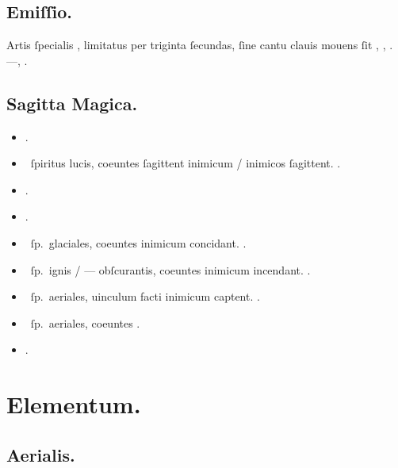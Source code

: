 \documentclass[12pt]{book}
\begin{document}
\subsection{Emiſſio.}\label{emissio}

Artis ſpecialis , limitatus per triginta ſecundas,
ſine cantu clauis mouens ſit , ,
.
---, .

\subsection{Sagitta Magica.}\label{sagitta-magica}

\begin{itemize}
  \item {}.
  \item {}~ſpiritus lucis, coeuntes ſagittent inimicum / inimicos ſagittent. .
  \item \textelp{} .
  \item \textelp{} .
  \item {}~ſp.~glaciales, coeuntes inimicum concidant. .
  \item {}~ſp.~ignis / --- obſcurantis, coeuntes inimicum incendant. .
  \item {}~ſp.~aeriales, uinculum facti inimicum captent. .
  \item {}~ſp.~aeriales, coeuntes \textelp{} .
  \item \textelp{} .
\end{itemize}

\section{Elementum.}\label{elementum}
\subsection{Aerialis.}\label{aerialis}
\end{document}
